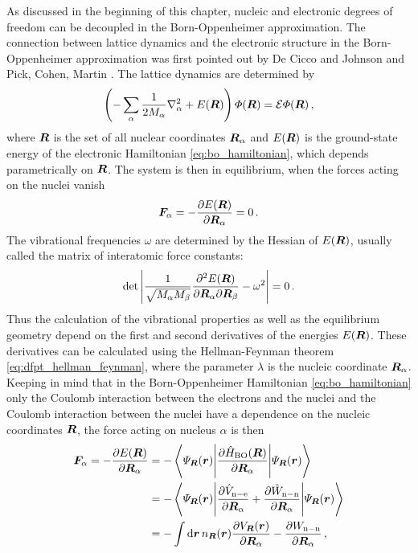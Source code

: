 \documentclass[main.tex]{subfiles}
\begin{document}
As discussed in the beginning of this chapter, nucleic and electronic degrees of freedom can be decoupled in the Born-Oppenheimer approximation.
The connection between lattice dynamics and the electronic structure in the Born-Oppenheimer approximation was first pointed out by De Cicco and Johnson  \cite{decicco_quantum_1969} and Pick, Cohen, Martin \cite{pick_microscopic_1970}.
The lattice dynamics are determined by
\begin{equation}
    \left( - \sum_{\alpha} \frac{1}{2 M_{\alpha}} \nabla^2_{\alpha} + E(\vb*{R}) \right) \Phi (\vb*{R}) = \mathcal{E} \Phi (\vb*{R})\,,
\end{equation}
where \(\vb*{R}\) is the set of all nuclear coordinates \(\vb*{R}_{\alpha}\) and \(E(\vb*{R})\) is the ground-state energy of the electronic Hamiltonian \ref{eq:bo_hamiltonian}, which depends parametrically on \(\vb*{R}\).
The system is then in equilibrium, when the forces acting on the nuclei vanish
\begin{equation}
    \vb*{F}_{\alpha} = - \pdv{E(\vb*{R})}{\vb*{R}_{\alpha}} = 0\,.
\end{equation}
The vibrational frequencies \(\omega\) are determined by the Hessian of \(E(\vb*{R})\), usually called the matrix of interatomic force constants:
\begin{equation}
    \det \left\vert \frac{1}{\sqrt{M_{\alpha} M_{\beta}}} \pdv{E(\vb*{R})}{\vb*{R}_{\alpha}}{\vb*{R}_{\beta}} - \omega^2 \right\vert = 0\,.
\end{equation}
Thus the calculation of the vibrational properties as well as the equilibrium geometry depend on the first and second derivatives of the energies \(E(\vb*{R})\).
These derivatives can be calculated using the Hellman-Feynman theorem \ref{eq:dfpt_hellman_feynman}, where the parameter \(\lambda\) is the nucleic coordinate \(\vb*{R}_{\alpha}\). 
Keeping in mind that in the Born-Oppenheimer Hamiltonian \ref{eq:bo_hamiltonian} only the Coulomb interaction between the electrons and the nuclei and the Coulomb interaction between the nuclei have a dependence on the nucleic coordinates \(\vb*{R}\), the force acting on nucleus \(\alpha\) is then
\begin{align}
    \vb*{F}_{\alpha} = - \pdv{E(\vb*{R})}{\vb*{R}_{\alpha}} &= - \mel**{\Psi_{\vb*{R}}(\vb*{r})}{\pdv{\hat{H}_{\mathrm{BO}} (\vb*{R})}{\vb*{R}_{\alpha}}}{\Psi_{\vb*{R}}(\vb*{r})} \\
    &= - \mel**{\Psi_{\vb*{R}}(\vb*{r})}{\pdv{\hat{V}_{\mathrm{n-e}}}{\vb*{R}_{\alpha}} + \pdv{\hat{W}_{\mathrm{n-n}}}{\vb*{R}_{\alpha}}}{\Psi_{\vb*{R}}(\vb*{r})} \\
    &= - \int \dd{\vb*{r}} n_{\vb*{R}} (\vb*{r}) \pdv{V_{\vb*{R}} (\vb*{r})}{\vb*{R}_{\alpha}} - \pdv{W_{\mathrm{n-n}}}{\vb*{R}_{\alpha}}\,,
\end{align}
\end{document}
